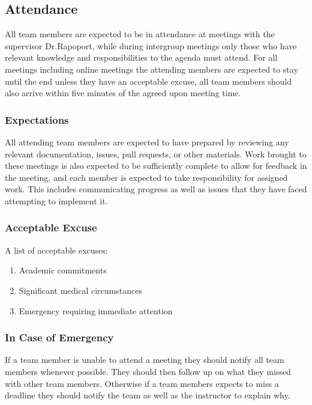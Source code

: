 \documentclass{article}
\begin{document}
\subsection*{Attendance}

All team members are expected to be in attendance at meetings with the supervisor Dr.Rapoport, 
while during intergroup meetings only those who have relevant knowledge and responsibilities to the agenda must attend.
For all meetings including online meetings the attending members are expected to stay until the end unless they have an acceptable excuse,
all team members should also arrive within five minutes of the agreed upon meeting time.

\subsubsection*{Expectations}

All attending team members are expected to have prepared by reviewing any relevant documentation, issues, pull requests, or other materials.
Work brought to these meetings is also expected to be sufficiently complete to allow for feedback in the meeting, 
and each member is expected to take responsibility for assigned work. This includes communicating progress as well as issues that they have faced attempting to implement it.

\subsubsection*{Acceptable Excuse}

A list of acceptable excuses:

\begin{enumerate}
    \item Academic commitments
    \item Significant medical circumstances
    \item Emergency requiring immediate attention
\end{enumerate}

\subsubsection*{In Case of Emergency}

If a team member is unable to attend a meeting they should notify all team members whenever possible. They should then follow up on what they missed with other team members.
Otherwise if a team members expects to miss a deadline they should notify the team as well as the instructor to explain why.
\end{document}
